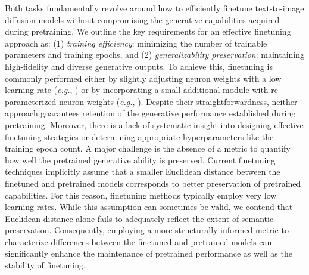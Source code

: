 Both tasks fundamentally revolve around how to efficiently finetune text-to-image diffusion models without compromising the generative capabilities acquired during pretraining. We outline the key requirements for an effective finetuning approach as: (1) \emph{training efficiency}: minimizing the number of trainable parameters and training epochs, and (2) \emph{generalizability preservation}: maintaining high-fidelity and diverse generative outputs. To achieve this, finetuning is commonly performed either by slightly adjusting neuron weights with a low learning rate (\emph{e.g.}, \cite{ruiz2023dreambooth}) or by incorporating a small additional module with re-parameterized neuron weights (\emph{e.g.}, \cite{hulora2022,zhang2023adding}). Despite their straightforwardness, neither approach guarantees retention of the generative performance established during pretraining. Moreover, there is a lack of systematic insight into designing effective finetuning strategies or determining appropriate hyperparameters like the training epoch count. A major challenge is the absence of a metric to quantify how well the pretrained generative ability is preserved. Current finetuning techniques implicitly assume that a smaller Euclidean distance between the finetuned and pretrained models corresponds to better preservation of pretrained capabilities. For this reason, finetuning methods typically employ very low learning rates. While this assumption can sometimes be valid, we contend that Euclidean distance alone fails to adequately reflect the extent of semantic preservation. Consequently, employing a more structurally informed metric to characterize differences between the finetuned and pretrained models can significantly enhance the maintenance of pretrained performance as well as the stability of finetuning.

